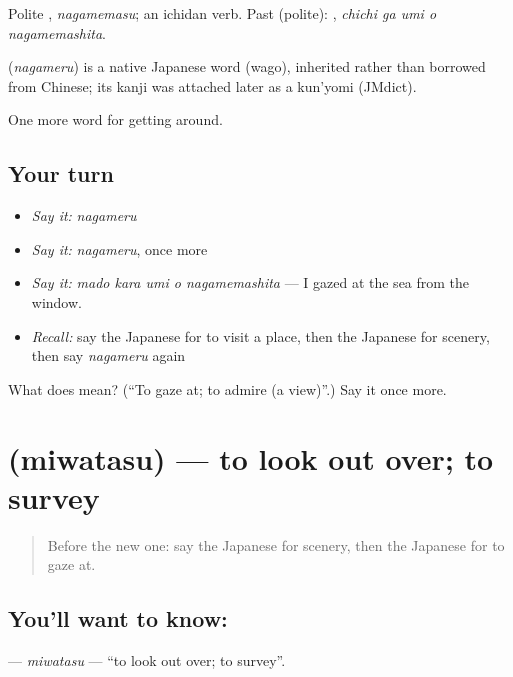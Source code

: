 Polite \textbf{}, \emph{nagamemasu}; an ichidan verb. Past (polite): \textbf{  }, \emph{chichi ga umi o nagamemashita}.

\begin{cousinweb}
\textbf{} (\emph{nagameru}) is a native Japanese word (wago), inherited rather than borrowed from Chinese; its kanji was attached later as a kun'yomi (JMdict).
\end{cousinweb}

\begin{grammarlens}[title={What you've built}]
One more word for getting around.
\end{grammarlens}

\subsection*{Your turn}
\begin{itemize}
\raggedright
  \item \emph{Say it:} \emph{nagameru}
  \item \emph{Say it:} \emph{nagameru}, once more
  \item \emph{Say it:} \emph{mado kara umi o nagamemashita} — I gazed at the sea from the window.
  \item \emph{Recall:} say the Japanese for to visit a place, then the Japanese for scenery, then say \emph{nagameru} again
\end{itemize}

\begin{tcolorbox}[breakable,colback=teal!4,colframe=teal!35!black,title={Before you move on}]
What does  mean? (\textquotedblleft{}To gaze at; to admire (a view)\textquotedblright{}.) Say it once more.
\end{tcolorbox}
\section[\texorpdfstring{\ja{みわたす} (miwatasu)}{みわたす (miwatasu)}]{ (miwatasu) — to look out over; to survey}

\label{lesson:JA-C404-miwatasu}



\begin{quote}
Before the new one: say the Japanese for scenery, then the Japanese for to gaze at.
\end{quote}

\subsection*{You'll want to know: }
\textbf{} — \emph{miwatasu} — \textquotedblleft{}to look out over; to survey\textquotedblright{}.

